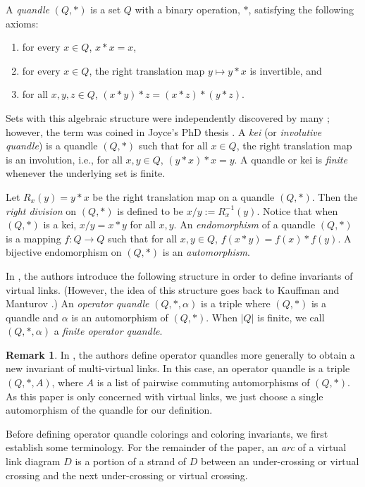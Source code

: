 \documentclass[11pt, twoside]{amsart}
\numberwithin{equation}{section}
\theoremstyle{definition}
\newtheorem{remark}[theorem]{Remark}
\numberwithin{equation}{section}
\begin{document}
A \textit{quandle} $(Q,*)$ is a set $Q$ with a binary operation, $*$, satisfying the following axioms:
\begin{enumerate}
    \item for every $x\in Q$, $x*x=x$,
    \item for every $x \in Q$, the right translation map $y \mapsto y*x$ is invertible, and
    \item for all $x,y,z\in Q$, $(x*y)*z=(x*z)*(y*z)$.
\end{enumerate}
 Sets with this algebraic structure were independently discovered by many \cite{Tak43, Joy79, Mat82, Bri88}; however, the term was coined in Joyce's PhD thesis \cite{Joy79}. A \textit{kei} (or \textit{involutive quandle}) is a quandle $(Q,*)$ such that for all $x\in Q$, the right translation map is an involution, i.e., for all $x, y \in Q$, $(y*x)*x=y$. A quandle or kei is \textit{finite} whenever the underlying set is finite.
    
    Let $R_x(y)=y*x$ be the right translation map on a quandle $(Q,*)$. Then the \textit{right division} on $(Q,*)$ is defined to be $x/y:= R_x^{-1}(y)$.  Notice that when $(Q,*)$ is a kei, $x/y=x*y$ for all $x,y$. An \textit{endomorphism} of a quandle $(Q,*)$ is a mapping $f:Q\to Q$ such that for all $x,y\in Q$, $f(x*y)=f(x)*f(y)$. A bijective endomorphism on $(Q,*)$ is an \textit{automorphism}.
    
    In \cite{KMV25}, the authors introduce the following structure in order to define invariants of virtual links. (However, the idea of this structure goes back to Kauffman and Manturov \cite{KM05}.) An \textit{operator quandle} $(Q,*,\alpha)$ is a triple where $(Q,*)$ is a quandle and $\alpha$ is an automorphism of $(Q,*)$. When $|Q|$ is finite, we call $(Q,*,\alpha)$  a \textit{finite operator quandle}.

    \begin{remark}
        In \cite{KMV25}, the authors define operator quandles more generally to obtain a new invariant of multi-virtual links. In this case, an operator quandle is a triple $(Q,*,A)$, where $A$ is a list of pairwise commuting automorphisms of $(Q,*)$. As this paper is only concerned with virtual links, we just choose a single automorphism of the quandle for our definition.
    \end{remark}

Before defining operator quandle colorings and coloring invariants, we first establish some terminology. For the remainder of the paper, an \textit{arc} of a virtual link diagram $D$ is a portion of a strand of $D$ between an under-crossing or virtual crossing and the next under-crossing or virtual crossing. 
    
\end{document}
